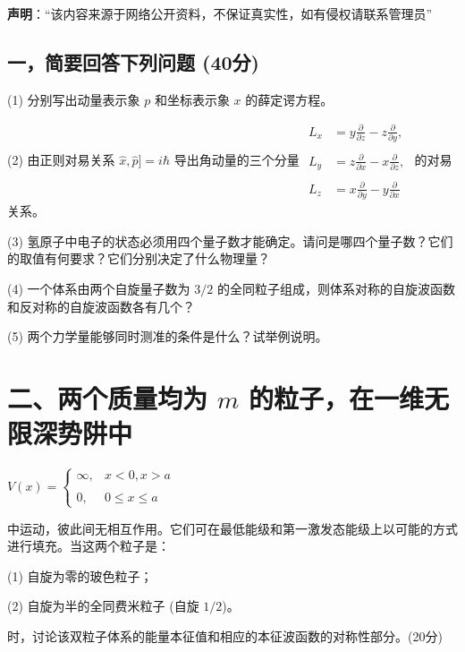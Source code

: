 
\textbf{声明}：“该内容来源于网络公开资料，不保证真实性，如有侵权请联系管理员”

\subsection{一，简要回答下列问题 (40分)}

(1) 分别写出动量表示象 $p$ 和坐标表示象 $x$ 的薛定谔方程。

(2) 由正则对易关系 $\hat{x}, \hat{p}] = i\hbar$ 导出角动量的三个分量
$\begin{aligned}    L_x &= y \frac{\partial}{\partial z} - z \frac{\partial}{\partial y}, \\\\    L_y &= z \frac{\partial}{\partial x} - x \frac{\partial}{\partial z}, \\\\    L_z &= x \frac{\partial}{\partial y} - y \frac{\partial}{\partial x}\end{aligned}$
的对易关系。

(3) 氢原子中电子的状态必须用四个量子数才能确定。请问是哪四个量子数？它们的取值有何要求？它们分别决定了什么物理量？

(4) 一个体系由两个自旋量子数为 $3/2$ 的全同粒子组成，则体系对称的自旋波函数和反对称的自旋波函数各有几个？

(5) 两个力学量能够同时测准的条件是什么？试举例说明。

\section*{二、两个质量均为 $m$ 的粒子，在一维无限深势阱中}

$V(x) = \begin{cases} \infty, & x < 0, x > a \\\\0, & 0 \leq x \leq a \end{cases}$

中运动，彼此间无相互作用。它们可在最低能级和第一激发态能级上以可能的方式进行填充。当这两个粒子是：

(1) 自旋为零的玻色粒子；

(2) 自旋为半的全同费米粒子 (自旋 $1/2$)。

时，讨论该双粒子体系的能量本征值和相应的本征波函数的对称性部分。(20分)
